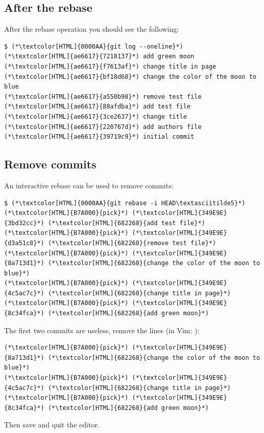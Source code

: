 \subsection{After the rebase}
\begin{frame}[fragile]
  \subslidetitle

   After the rebase operation you should see the following:
  \begin{lstlisting}
$ (*\textcolor[HTML]{0000AA}{git log --oneline}*)
(*\textcolor[HTML]{ae6617}{7218137}*) add green moon
(*\textcolor[HTML]{ae6617}{f7613af}*) change title in page
(*\textcolor[HTML]{ae6617}{bf18d68}*) change the color of the moon to blue
(*\textcolor[HTML]{ae6617}{a550b98}*) remove test file
(*\textcolor[HTML]{ae6617}{88afdba}*) add test file
(*\textcolor[HTML]{ae6617}{3ce2637}*) change title
(*\textcolor[HTML]{ae6617}{220767d}*) add authors file
(*\textcolor[HTML]{ae6617}{39719c9}*) initial commit
\end{lstlisting}
\end{frame}

\subsection{Remove commits}
\begin{frame}[fragile]
  \subslidetitle
  An interactive rebase can be used to remove commits:
  \begin{lstlisting}
$ (*\textcolor[HTML]{0000AA}{git rebase -i HEAD\textasciitilde5}*)
(*\textcolor[HTML]{B7A000}{pick}*) (*\textcolor[HTML]{349E9E}{3bd32cc}*) (*\textcolor[HTML]{682268}{add test file}*)
(*\textcolor[HTML]{B7A000}{pick}*) (*\textcolor[HTML]{349E9E}{d3a51c8}*) (*\textcolor[HTML]{682268}{remove test file}*)
(*\textcolor[HTML]{B7A000}{pick}*) (*\textcolor[HTML]{349E9E}{8a713d1}*) (*\textcolor[HTML]{682268}{change the color of the moon to blue}*)
(*\textcolor[HTML]{B7A000}{pick}*) (*\textcolor[HTML]{349E9E}{4c5ac7c}*) (*\textcolor[HTML]{682268}{change title in page}*)
(*\textcolor[HTML]{B7A000}{pick}*) (*\textcolor[HTML]{349E9E}{8c34fca}*) (*\textcolor[HTML]{682268}{add green moon}*)
\end{lstlisting}
  The first two commits are useless, remove the lines (in Vim: ):
  \begin{lstlisting}
(*\textcolor[HTML]{B7A000}{pick}*) (*\textcolor[HTML]{349E9E}{8a713d1}*) (*\textcolor[HTML]{682268}{change the color of the moon to blue}*)
(*\textcolor[HTML]{B7A000}{pick}*) (*\textcolor[HTML]{349E9E}{4c5ac7c}*) (*\textcolor[HTML]{682268}{change title in page}*)
(*\textcolor[HTML]{B7A000}{pick}*) (*\textcolor[HTML]{349E9E}{8c34fca}*) (*\textcolor[HTML]{682268}{add green moon}*)
\end{lstlisting}


  Then save and quit the editor.

\end{frame}

